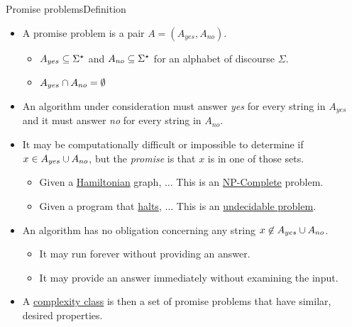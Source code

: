 \begin{frame}{Promise problems}{Definition}

\begin{itemize}[<+->]
    \item A promise problem is a pair $A=(A_{yes}, A_{no})$.
    \begin{itemize}
        \item $A_{yes} \subseteq \Sigma^{\star}$ and $A_{no} \subseteq \Sigma^{\star}$ for an alphabet of discourse $\Sigma$.
        \item $A_{yes} \cap A_{no}=\emptyset$
    \end{itemize}
    \item An algorithm under consideration must answer \emph{yes} for every string in $A_{yes}$ and it must answer \emph{no} for every string in $A_{no}$.
    
    \item It may be computationally difficult or impossible to determine if $x \in A_{yes} \cup A_{no}$, but the \emph{promise} is that $x$ is in one of those sets.
    \begin{itemize}
        \item Given a \href{https://en.wikipedia.org/wiki/Hamiltonian_path}{Hamiltonian} graph, $\ldots$  This is an \href{https://en.wikipedia.org/wiki/NP-completeness}{NP-Complete} problem.
        \item Given a program that \href{https://en.wikipedia.org/wiki/Halting_problem}{halts}, $\ldots$  This is an \href{https://en.wikipedia.org/wiki/Undecidable_problem}{undecidable problem}.
    \end{itemize}
    \item An algorithm has no obligation concerning any string $x\not\in A_{yes} \cup A_{no}$.
    \begin{itemize}
        \item It may run forever without providing an answer.
        \item It may provide an answer immediately without examining the input.
    \end{itemize}
    \item A \href{https://en.wikipedia.org/wiki/Complexity_class}{complexity class} is then a set of promise problems that have similar, desired properties.
\end{itemize}
    
\end{frame}
